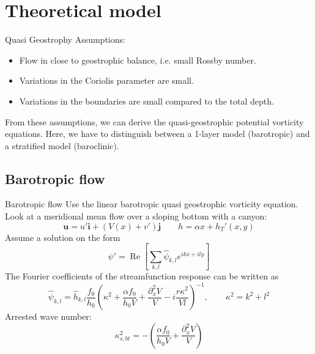 \documentclass{beamer}
\newcommand{\pdd}[1]{\partial_{#1}^2}
\begin{document}
\section{Theoretical model}

\begin{frame}{Quasi Geostrophy}
Assumptions:
    \begin{itemize}
        \item Flow in close to geostrophic balance, i.e. small Rossby number.
        \item Variations in the Coriolis parameter are small.
        \item Variations in the boundaries are small compared to the total depth. 
    \end{itemize}
From these assumptions, we can derive the quasi-geostrophic potential vorticity equations. Here, we have to distinguish between a 1-layer model (barotropic) and a stratified model (baroclinic).
\end{frame}

\subsection{Barotropic flow}
\begin{frame}{Barotropic flow}
Use the linear barotropic quasi geostrophic vorticity equation. 
Look at a meridional mean flow over a sloping bottom with a canyon: 
\begin{equation*}
    \mathbf{u} = u'\mathbf{i} + \left(V(x)+v'\right)\mathbf{j} \qquad h = \alpha x + h_T'(x,y)
\end{equation*}
Assume a solution on the form
\begin{equation*}
    \psi' = \operatorname{Re}\left[\sum_{k,l} \hat{\psi}_{k,l}e^{ikx+ily}\right]
\end{equation*}
The Fourier coefficients of the streamfunction response can be written as
\begin{equation*}
    \hat{\psi}_{k,l} = \hat{h}_{k,l}\frac{f_0}{h_0}\left( \kappa^2 + \frac{\alpha f_0}{h_0V} + \frac{\pdd{x}V}{V} - i \frac{r\kappa^2}{Vl}\right)^{-1}, \qquad \kappa^2 = k^2+l^2 
\end{equation*}
Arrested wave number:
\begin{equation*}
    \kappa_{s,bt}^2 = -\left(\frac{\alpha f_0}{h_0V} + \frac{\pdd{x}V}{V}\right)
\end{equation*}
\end{frame}
\end{document}
